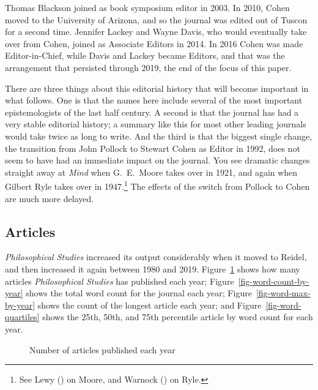 \documentclass[
  10pt,
  letterpaper,
  DIV=11,
  numbers=noendperiod,
  twoside]{scrartcl}
\begin{document}
Thomas Blackson joined as book symposium editor in 2003. In 2010, Cohen
moved to the University of Arizona, and so the journal was edited out of
Tuscon for a second time. Jennifer Lackey and Wayne Davis, who would
eventually take over from Cohen, joined as Associate Editors in 2014. In
2016 Cohen was made Editor-in-Chief, while Davis and Lackey became
Editors, and that was the arrangement that persisted through 2019, the
end of the focus of this paper.

There are three things about this editorial history that will become
important in what follows. One is that the names here include several of
the most important epistemologists of the last half century. A second is
that the journal has had a very stable editorial history; a summary like
this for most other leading journals would take twice as long to write.
And the third is that the biggest single change, the transition from
John Pollock to Stewart Cohen as Editor in 1992, does not seem to have
had an immediate impact on the journal. You see dramatic changes
straight away at \emph{Mind} when G.~E.~Moore takes over in 1921, and
again when Gilbert Ryle takes over in 1947.\footnote{See Lewy
  () on Moore, and Warnock
  () on Ryle.} The effects of the switch
from Pollock to Cohen are much more delayed.

\subsection{Articles}\label{articles}

\emph{Philosophical Studies} increased its output considerably when it
moved to Reidel, and then increased it again between 1980 and 2019.
Figure~\ref{fig-article-count-by-year} shows how many articles
\emph{Philosophical Studies} has published each year;
Figure~\ref{fig-word-count-by-year} shows the total word count for the
journal each year; Figure~\ref{fig-word-max-by-year} shows the count of
the longest article each year; and Figure~\ref{fig-word-quartiles} shows
the 25th, 50th, and 75th percentile article by word count for each year.

\begin{figure}


\caption{\label{fig-article-count-by-year}Number of articles published
each year}

\end{figure}%
\end{document}
